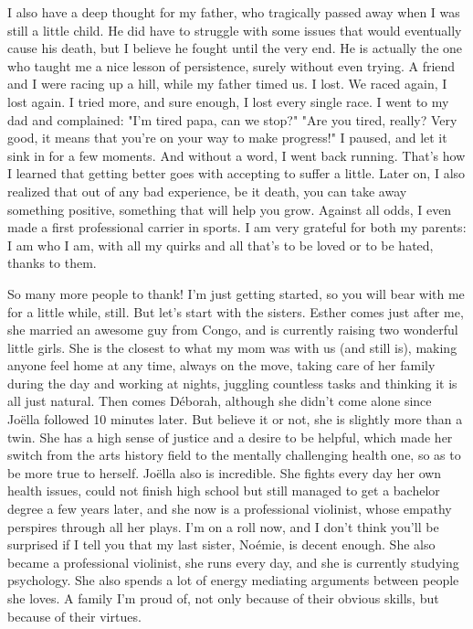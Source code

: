 I also have a deep thought for my father, who tragically passed away when I was still a little child. He did have to struggle with some issues that would eventually cause his death, but I believe he fought until the very end. He is actually the one who taught me a nice lesson of persistence, surely without even trying. A friend and I were racing up a hill, while my father timed us. I lost. We raced again, I lost again. I tried more, and sure enough, I lost every single race. I went to my dad and complained: "I'm tired papa, can we stop?" "Are you tired, really? Very good, it means that you're on your way to make progress!" I paused, and let it sink in for a few moments. And without a word, I went back running. That's how I learned that getting better goes with accepting to suffer a little. Later on, I also realized that out of any bad experience, be it death, you can take away something positive, something that will help you grow. Against all odds, I even made a first professional carrier in sports. I am very grateful for both my parents: I am who I am, with all my quirks and all that's to be loved or to be hated, thanks to them.

So many more people to thank! I'm just getting started, so you will bear with me for a little while, still. But let's start with the sisters. Esther comes just after me, she married an awesome guy from Congo, and is currently raising two wonderful little girls. She is the closest to what my mom was with us (and still is), making anyone feel home at any time, always on the move, taking care of her family during the day and working at nights, juggling countless tasks and thinking it is all just natural. Then comes Déborah, although she didn't come alone since Joëlla followed 10 minutes later. But believe it or not, she is slightly more than a twin. She has a high sense of justice and a desire to be helpful, which made her switch from the arts history field to the mentally challenging health one, so as to be more true to herself. Joëlla also is incredible. She fights every day her own health issues, could not finish high school but still managed to get a bachelor degree a few years later, and she now is a professional violinist, whose empathy perspires through all her plays. I'm on a roll now, and I don't think you'll be surprised if I tell you that my last sister, Noémie, is decent enough. She also became a professional violinist, she runs every day, and she is currently studying psychology. She also spends a lot of energy mediating arguments between people she loves. A family I'm proud of, not only because of their obvious skills, but because of their virtues.


